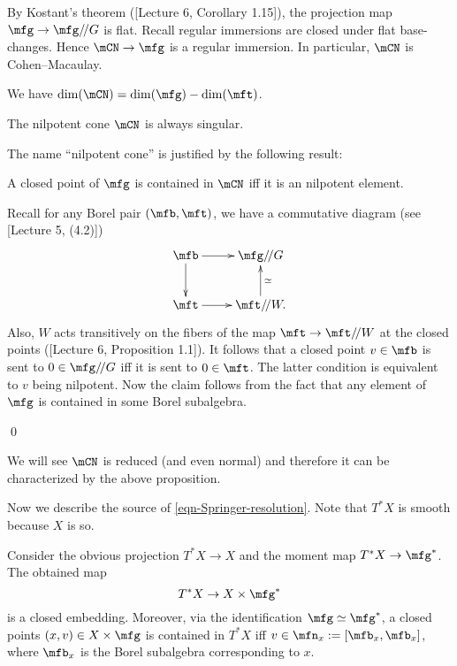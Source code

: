 	\begin{rem}
		\label{rem-Nilp-CM}
		By Kostant's theorem ([Lecture 6, Corollary 1.15]), the projection map $\mfg \to \mfg/\!/G$ is flat. Recall regular immersions are closed under flat base-changes. Hence $\mCN \to \mfg$ is a regular immersion. In particular, $\mCN$ is Cohen--Macaulay.
	\end{rem}

	\begin{rem}
		We have $\dim(\mCN) = \dim(\mfg)-\dim(\mft)$.
	\end{rem}

	\begin{warn}
		The nilpotent cone $\mCN$ is always singular.
	\end{warn}

	The name ``nilpotent cone'' is justified by the following result:

	\begin{prop}
		A closed point of $\mfg$ is contained in $\mCN$ iff it is an nilpotent element.
	\end{prop}

	\proof
		Recall for any Borel pair $(\mfb,\mft)$, we have a commutative diagram (see [Lecture 5, (4.2)])
		\[
			\xymatrix{
				\mfb \ar[r] \ar[d] & \mfg/\!/G \\
				\mft \ar[r] & \mft/\!/W. \ar[u]_-\simeq
			}
		\]
		Also, $W$ acts transitively on the fibers of the map $\mft\to \mft/\!/W$ at the closed points ([Lecture 6, Proposition 1.1]). It follows that a closed point $v\in \mfb$ is sent to $0\in \mfg/\!/G$ iff it is sent to $0\in \mft$. The latter condition is equivalent to $v$ being nilpotent. Now the claim follows from the fact that any element of $\mfg$ is contained in some Borel subalgebra.

	\qed

	\begin{rem}
		We will see $\mCN$ is reduced (and even normal) and therefore it can be characterized by the above proposition.
	\end{rem}

	Now we describe the source of \eqref{eqn-Springer-resolution}. Note that $T^*X$ is smooth because $X$ is so.

	\begin{prop}
		Consider the obvious projection $T^* X \to X$ and the moment map $T^*X \to \mfg^*$. The obtained map
		\begin{equation}
			\label{eqn-cotagent-as-closed-sub}
			T^*X \to X\mt \mfg^*
		\end{equation}
		is a closed embedding. Moreover, via the identification $\mfg\simeq \mfg^*$, a closed points $(x,v)\in X\mt \mfg$ is contained in $T^*X$ iff $v\in \mfn_x:=[\mfb_x,\mfb_x]$, where $\mfb_x$ is the Borel subalgebra corresponding to $x$.
	\end{prop}

